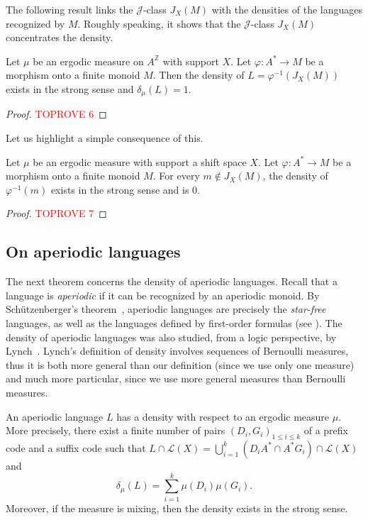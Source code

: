 \documentclass[a4paper,UKenglish,numberwithinsect,cleveref]{lipics-v2021}
\newcommand{\JJ}{\mathrel{\mathscr{J}}}
\newcommand{\Z}{\mathbb{Z}}
\newcommand{\cL}{\mathcal L}
\newcommand*{\from}{\colon}
\begin{document}
The following result links the $\JJ$-class $J_X(M)$ with the densities of the languages recognized by $M$. Roughly speaking, it shows that the $\JJ$-class $J_X(M)$ concentrates the density. 

\begin{proposition}\label{p:density-concentration}
    Let $\mu$ be an ergodic measure on $A^\Z$ with support $X$. Let $\varphi\from A^*\to M$ be a morphism onto a finite monoid $M$. Then the density of $L = \varphi^{-1}(J_X(M))$ exists in the strong sense and $\delta_\mu(L) = 1$.
\end{proposition}

\begin{proof}\textcolor{red}{TOPROVE 6}\end{proof}

Let us highlight a simple consequence of this.
\begin{corollary}\label{c:density-0}
    Let $\mu$ be an ergodic measure with support a shift space $X$. Let $\varphi\from A^*\to M$ be a morphism onto a finite monoid $M$. For every $m\notin J_X(M)$, the density of $\varphi^{-1}(m)$ exists in the strong sense and is 0. 
\end{corollary}

\begin{proof}\textcolor{red}{TOPROVE 7}\end{proof}

\subsection{On aperiodic languages} \label{subsec:aperiod}
The next theorem concerns the density of aperiodic languages. Recall that a language is \emph{aperiodic} if it can be recognized by an aperiodic monoid. By Schützenberger's theorem~\cite{Schutzenberger1965a}, aperiodic languages are precisely the \emph{star-free} languages, as well as the languages defined by first-order formulas (see \cite[Theorem~4.1]{book/Perrin2004}). The density of aperiodic languages was also studied, from a logic perspective, by Lynch~\cite{Lynch1993}. Lynch's definition of density involves sequences of Bernoulli measures, thus it is both more general than our definition (since we use only one measure) and much more particular, since we use more general measures than Bernoulli measures.

\begin{theorem}\label{theoremDensityAperiodic}
    An aperiodic language $L$ has a density with respect to an ergodic measure $\mu$.  More precisely, there exist a finite number of pairs $(D_i,G_i)_{1\le i\le k}$ of a prefix code and a suffix code such that $L\cap\cL(X)=\bigcup_{i=1}^k(D_iA^*\cap A^*G_i)\cap \cL(X)$ and
    \begin{equation}
        \delta_\mu(L)=\sum_{i=1}^k\mu(D_i)\mu(G_i).\label{eqDensityAperiodic}
    \end{equation}
    Moreover, if the measure is mixing, then the density exists in the strong sense.
\end{theorem}
\end{document}
